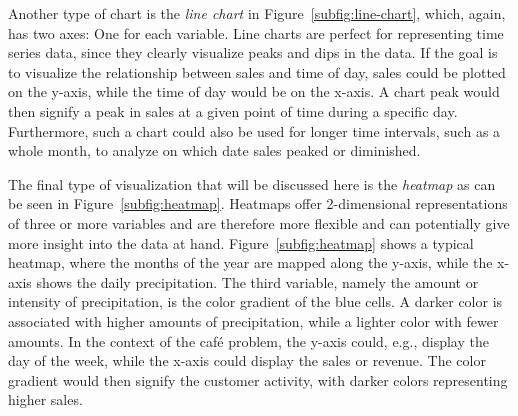Another type of chart is the \textit{line chart} in Figure~\ref{subfig:line-chart}, which, again, has two axes: One for
each variable.
Line charts are perfect for representing time series data, since they clearly visualize peaks and dips in the data.
If the goal is to visualize the relationship between sales and time of day, sales could be plotted on the y-axis,
while the time of day would be on the x-axis.
A chart peak would then signify a peak in sales at a given point of time during a specific day.
Furthermore, such a chart could also be used for longer time intervals, such as a whole month, to analyze on which date
sales peaked or diminished.

The final type of visualization that will be discussed here is the \textit{heatmap} as can be seen in
Figure~\ref{subfig:heatmap}.
Heatmaps offer 2-dimensional representations of three or more variables and are therefore more flexible and can
potentially give more insight into the data at hand.
Figure~\ref{subfig:heatmap} shows a typical heatmap, where the months of the year are mapped along the y-axis, while the
x-axis shows the daily precipitation.
The third variable, namely the amount or intensity of precipitation, is the color gradient of the blue cells.
A darker color is associated with higher amounts of precipitation, while a lighter color with fewer amounts.
In the context of the café problem, the y-axis could, e.g., display the day of the week, while the x-axis could display
the sales or revenue.
The color gradient would then signify the customer activity, with darker colors representing higher sales.
